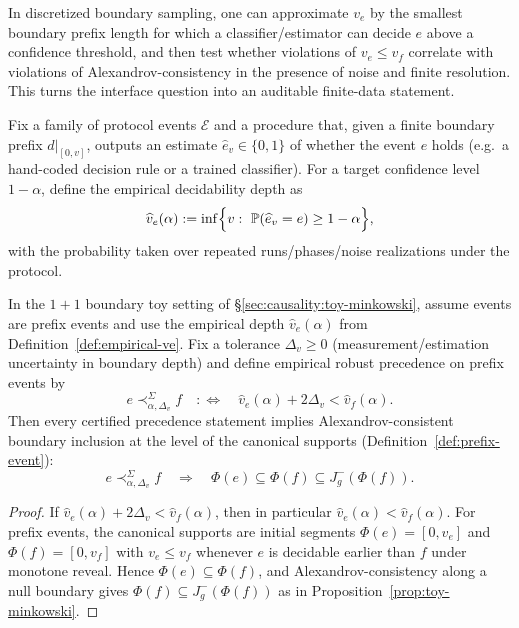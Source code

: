 \begin{remark}
In discretized boundary sampling, one can approximate $v_e$ by the smallest boundary prefix length for which a classifier/estimator can decide $e$ above a confidence threshold, and then test whether violations of $v_e\le v_f$ correlate with violations of Alexandrov-consistency in the presence of noise and finite resolution. This turns the interface question into an auditable finite-data statement.
\end{remark}

\begin{definition}\label{def:empirical-ve}
Fix a family of protocol events $\mathcal{E}$ and a procedure that, given a finite boundary prefix $d|_{[0,v]}$, outputs an estimate $\widehat e_v\in\{0,1\}$ of whether the event $e$ holds (e.g.\ a hand-coded decision rule or a trained classifier). For a target confidence level $1-\alpha$, define the empirical decidability depth as
\[
\widehat v_e(\alpha):=\inf\Bigl\{v:\ \mathbb{P}(\widehat e_v = e)\ge 1-\alpha\Bigr\},
\]
with the probability taken over repeated runs/phases/noise realizations under the protocol.
\end{definition}

\begin{proposition}\label{prop:toy-minkowski-robust}
In the $1\!+\!1$ boundary toy setting of \S\ref{sec:causality:toy-minkowski}, assume events are prefix events and use the empirical depth $\widehat v_e(\alpha)$ from Definition~\ref{def:empirical-ve}. Fix a tolerance $\Delta_v\ge 0$ (measurement/estimation uncertainty in boundary depth) and define empirical robust precedence on prefix events by
\[
e\prec^{\Sigma}_{\alpha,\Delta_v} f
\quad:\Longleftrightarrow\quad
\widehat v_e(\alpha) + 2\Delta_v < \widehat v_f(\alpha).
\]
Then every certified precedence statement implies Alexandrov-consistent boundary inclusion at the level of the canonical supports (Definition~\ref{def:prefix-event}):
\[
e\prec^{\Sigma}_{\alpha,\Delta_v} f
\quad\Longrightarrow\quad
\Phi(e)\subseteq \Phi(f)\subseteq J^-_g(\Phi(f)).
\]
\end{proposition}

\begin{proof}
If $\widehat v_e(\alpha) + 2\Delta_v < \widehat v_f(\alpha)$, then in particular $\widehat v_e(\alpha)<\widehat v_f(\alpha)$. For prefix events, the canonical supports are initial segments $\Phi(e)=[0,v_e]$ and $\Phi(f)=[0,v_f]$ with $v_e\le v_f$ whenever $e$ is decidable earlier than $f$ under monotone reveal. Hence $\Phi(e)\subseteq\Phi(f)$, and Alexandrov-consistency along a null boundary gives $\Phi(f)\subseteq J^-_g(\Phi(f))$ as in Proposition~\ref{prop:toy-minkowski}.
\end{proof}

